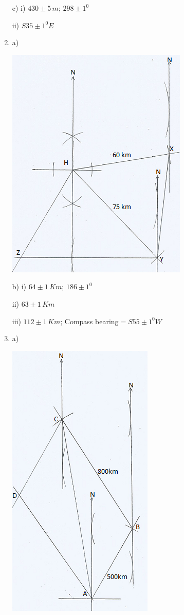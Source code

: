 \documentclass[
  a4paperpaper,
]{scrbook}
\begin{document}
\begin{tcolorbox}
\begin{enumerate}
  c) i) \(430\pm5\,m\); \(298\pm1^0\)

  ii) \(S35\pm1^0E\)
\item
  a)

  \includegraphics{figures/10Q.png}

  b) i) \(64\pm1\,Km\); \(186\pm1^0\)

  ii) \(63\pm1\,Km\)

  iii) \(112\pm1\,Km\); Compass bearing\(=S55\pm1^0W\)
\item
  a)

  \includegraphics{figures/11Q.png}


\end{enumerate}
\end{tcolorbox}
\end{document}
